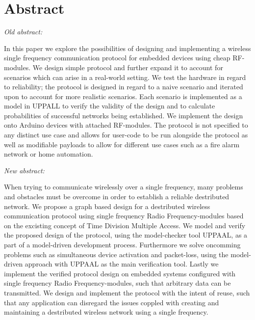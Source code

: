 \section{Abstract}
\begin{center}
    \textit{Old abstract:}
\end{center}
In this paper we explore the possibilities of designing and implementing a wireless single frequency communication protocol for embedded devices using cheap RF-modules.
We design simple protocol and further expand it to account for scenarios which can arise in a real-world setting.
We test the hardware in regard to reliability; the protocol is designed in regard to a naive scenario and iterated upon to account for more realistic scenarios.
Each scenario is implemented as a model in UPPALL to verify the validity of the design and to calculate probabilities of successful networks being established.
We implement the design onto Arduino devices with attached RF-modules.
The protocol is not specified to any distinct use case and allows for user-code to be run alongside the protocol as well as modifiable payloads to allow for different use cases such as a fire alarm network or home automation. 
\begin{center}
    \textit{New abstract:}
\end{center}
When trying to communicate wirelessly over a single frequency, many problems and obstacles must be overcome in order to establish a reliable destributed network. 
We propose a graph based design for a destributed wireless communication protocol using single frequency Radio Frequency-modules based on the excisting concept of Time Division Multiple Access. 
We model and verify the proposed design of the protocol, using the model-checker tool UPPAAL, as a part of a model-driven development process. 
Furthermore we solve oncomming problems such as simultaneous device activation and packet-loss, using the model-driven approach with UPPAAL as the main verification tool. 
Lastly we implement the verified protocol design on embedded systems configured with single frequency Radio Frequency-modules, such that arbitrary data can be transmitted. 
We design and implement the protocol with the intent of reuse, such that any application can disregard the issues coppled with creating and maintaining a destributed wireless network using a single frequency.
